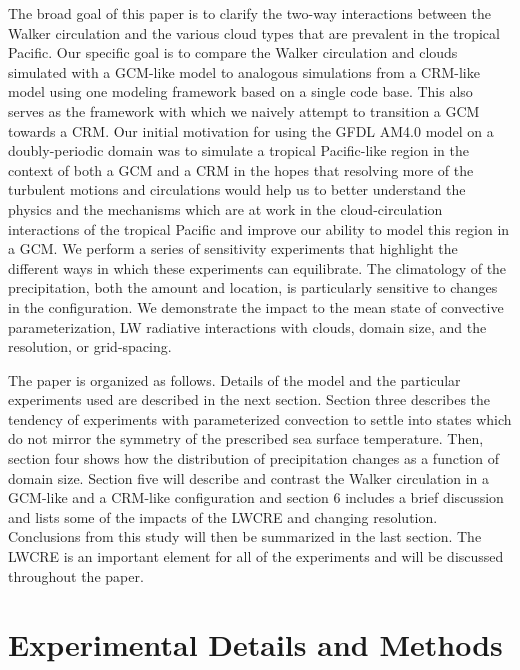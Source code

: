 \documentclass[draft]{agujournal2019}
\begin{document}

The broad goal of this paper is to clarify the two-way interactions between the Walker circulation and 
the various cloud types that are prevalent in the tropical Pacific.   Our specific goal is
to compare the Walker circulation and clouds simulated with a GCM-like model to analogous 
simulations from a CRM-like model using one modeling framework based on a single code base. 
This also serves as the framework with which we naively attempt to transition a GCM 
towards a CRM.  Our initial motivation for using the 
GFDL AM4.0 model on a doubly-periodic domain was to simulate a tropical Pacific-like region 
in the context of both a GCM and a CRM in the hopes that resolving more of the turbulent motions and circulations
would help us to better understand the physics and the mechanisms which are at work in the cloud-circulation
interactions of the tropical Pacific and improve our ability to model this region in a GCM.    
We perform a series of sensitivity experiments that highlight the different ways in which these experiments can equilibrate.  
The climatology of the precipitation, both the amount and location, is particularly sensitive to changes in the configuration.   
We demonstrate the impact to the mean state of convective parameterization, LW radiative interactions with clouds, domain size, 
and the resolution, or grid-spacing.

The paper is organized as follows.  Details of the model and the particular experiments used are described
in the next section. Section three describes the tendency of experiments with parameterized convection 
to settle into states which do not mirror the symmetry of the prescribed sea surface temperature.   
Then, section four shows how the distribution of precipitation changes as a function of domain size.  
Section five will describe and contrast the Walker circulation in a GCM-like and a CRM-like configuration and
section 6 includes a brief discussion and lists some of the impacts of the LWCRE and changing 
resolution.  Conclusions from this study will then be summarized in the last section.   
The LWCRE is an important element for all of the experiments and will be 
discussed throughout the paper.  

\section{Experimental Details and Methods}
\end{document}

